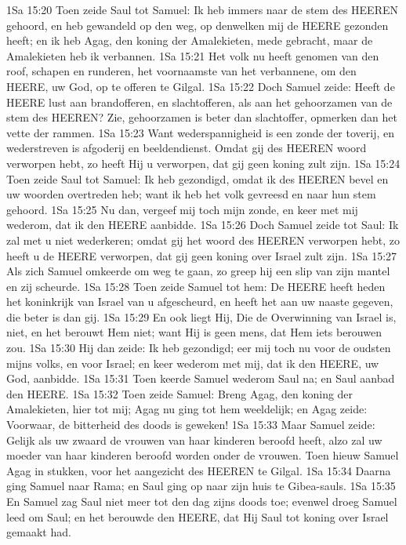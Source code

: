 1Sa 15:20  Toen zeide Saul tot Samuel: Ik heb immers naar de stem des HEEREN gehoord, en heb gewandeld op den weg, op denwelken mij de HEERE gezonden heeft; en ik heb Agag, den koning der Amalekieten, mede gebracht, maar de Amalekieten heb ik verbannen.
1Sa 15:21  Het volk nu heeft genomen van den roof, schapen en runderen, het voornaamste van het verbannene, om den HEERE, uw God, op te offeren te Gilgal.
1Sa 15:22  Doch Samuel zeide: Heeft de HEERE lust aan brandofferen, en slachtofferen, als aan het gehoorzamen van de stem des HEEREN? Zie, gehoorzamen is beter dan slachtoffer, opmerken dan het vette der rammen.
1Sa 15:23  Want wederspannigheid is een zonde der toverij, en wederstreven is afgoderij en beeldendienst. Omdat gij des HEEREN woord verworpen hebt, zo heeft Hij u verworpen, dat gij geen koning zult zijn.
1Sa 15:24  Toen zeide Saul tot Samuel: Ik heb gezondigd, omdat ik des HEEREN bevel en uw woorden overtreden heb; want ik heb het volk gevreesd en naar hun stem gehoord.
1Sa 15:25  Nu dan, vergeef mij toch mijn zonde, en keer met mij wederom, dat ik den HEERE aanbidde.
1Sa 15:26  Doch Samuel zeide tot Saul: Ik zal met u niet wederkeren; omdat gij het woord des HEEREN verworpen hebt, zo heeft u de HEERE verworpen, dat gij geen koning over Israel zult zijn.
1Sa 15:27  Als zich Samuel omkeerde om weg te gaan, zo greep hij een slip van zijn mantel en zij scheurde.
1Sa 15:28  Toen zeide Samuel tot hem: De HEERE heeft heden het koninkrijk van Israel van u afgescheurd, en heeft het aan uw naaste gegeven, die beter is dan gij.
1Sa 15:29  En ook liegt Hij, Die de Overwinning van Israel is, niet, en het berouwt Hem niet; want Hij is geen mens, dat Hem iets berouwen zou.
1Sa 15:30  Hij dan zeide: Ik heb gezondigd; eer mij toch nu voor de oudsten mijns volks, en voor Israel; en keer wederom met mij, dat ik den HEERE, uw God, aanbidde.
1Sa 15:31  Toen keerde Samuel wederom Saul na; en Saul aanbad den HEERE.
1Sa 15:32  Toen zeide Samuel: Breng Agag, den koning der Amalekieten, hier tot mij; Agag nu ging tot hem weeldelijk; en Agag zeide: Voorwaar, de bitterheid des doods is geweken!
1Sa 15:33  Maar Samuel zeide: Gelijk als uw zwaard de vrouwen van haar kinderen beroofd heeft, alzo zal uw moeder van haar kinderen beroofd worden onder de vrouwen. Toen hieuw Samuel Agag in stukken, voor het aangezicht des HEEREN te Gilgal.
1Sa 15:34  Daarna ging Samuel naar Rama; en Saul ging op naar zijn huis te Gibea-sauls.
1Sa 15:35  En Samuel zag Saul niet meer tot den dag zijns doods toe; evenwel droeg Samuel leed om Saul; en het berouwde den HEERE, dat Hij Saul tot koning over Israel gemaakt had.
